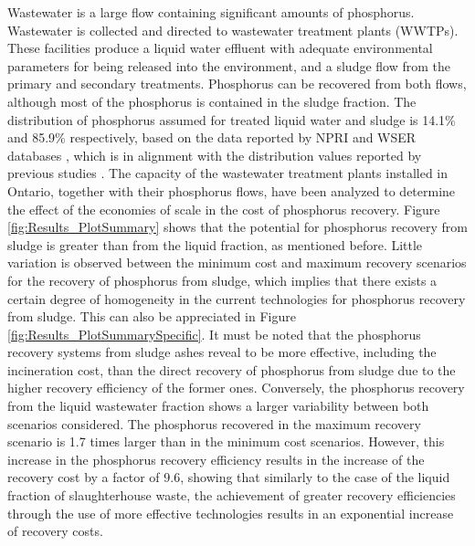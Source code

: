 \documentclass[]{elsarticle}
\begin{document}
Wastewater is a large flow containing significant amounts of phosphorus. Wastewater is collected and directed to wastewater treatment plants (WWTPs). These facilities produce a liquid water effluent with adequate environmental parameters for being released into the environment, and a sludge flow from the primary and secondary treatments. Phosphorus can be recovered from both flows, although most of the phosphorus is contained in the sludge fraction.
The distribution of phosphorus assumed for treated liquid water and sludge is 14.1\% and 85.9\% respectively,
based on the data reported by NPRI and WSER databases \citep{NPRI, WSER}, which is in alignment with the distribution values reported by previous studies \citep{egle_phosphorus_2016}. The capacity of the wastewater treatment plants installed in Ontario, together with their phosphorus flows, have been analyzed to determine the effect of the economies of scale in the cost of phosphorus recovery.
Figure \ref{fig:Results_PlotSummary} shows that the potential for phosphorus recovery from sludge is greater than from the liquid fraction, as mentioned before. Little variation is observed between the minimum cost and maximum recovery scenarios for the recovery of phosphorus from sludge, which implies that there exists a certain degree of homogeneity in the current technologies for phosphorus recovery from sludge. This can also be appreciated in Figure \ref{fig:Results_PlotSummarySpecific}. It must be noted that the phosphorus recovery systems from sludge ashes reveal to be more effective, including the incineration cost, than the direct recovery of phosphorus from sludge due to the higher recovery efficiency of the former ones. Conversely, the phosphorus recovery from the liquid wastewater fraction shows a larger variability between both scenarios considered. The phosphorus recovered in the maximum recovery scenario is 1.7 times larger than in the minimum cost scenarios. However, this increase in the phosphorus recovery efficiency results in the increase of the recovery cost by a factor of 9.6, showing that similarly to the case of the liquid fraction of slaughterhouse waste, the achievement of greater recovery efficiencies through the use of more effective technologies results in an exponential increase of recovery costs.
\end{document}
